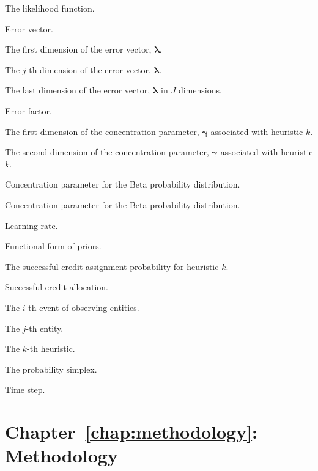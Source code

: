 \begin{description}
	\item [\parbox{2cm}{$\mathcal{L}$}] The likelihood function.
	\item [\parbox{2cm}{$\boldsymbol{\lambda}$}] Error vector.
	\item \item [\parbox{2cm}{$\lambda_{1}$}] The first dimension of the error vector, $\boldsymbol{\lambda}$.
	\item [\parbox{2cm}{$\lambda_{j}$}] The $j$-th dimension of the error vector, $\boldsymbol{\lambda}$.
	\item [\parbox{2cm}{$\lambda_{J}$}] The last dimension of the error vector, $\boldsymbol{\lambda}$ in $J$ dimensions.
	\item [\parbox{2cm}{$\epsilon$}] Error factor.
	\item [\parbox{2cm}{$\gamma_{1,k}$}] The first dimension of the concentration parameter, $\boldsymbol{\gamma}$ associated with heuristic $k$.
	\item [\parbox{2cm}{$\gamma_{2,k}$}] The second dimension of the concentration parameter, $\boldsymbol{\gamma}$ associated with heuristic $k$.
	\item [\parbox{2cm}{$\alpha$}] Concentration parameter for the Beta probability distribution.
	\item [\parbox{2cm}{$\beta$}] Concentration parameter for the Beta probability distribution.

	\item [\parbox{2cm}{$\eta$}] Learning rate.
	\item [\parbox{2cm}{$\mathcal{A}(v)$}] Functional form of priors.
	\item [\parbox{2cm}{$\psi_{k}$}] The successful credit assignment probability for heuristic $k$.
	\item [\parbox{2cm}{$c_{1}$}] Successful credit allocation.
	\item [\parbox{2cm}{$e_{i}$}] The $i$-th event of observing entities.
	\item [\parbox{2cm}{$e_{j}$}] The $j$-th entity.
	\item [\parbox{2cm}{$h_{k}$}] The $k$-th heuristic.
	\item [\parbox{2cm}{$S$}] The probability simplex.
	\item [\parbox{2cm}{$t$}] Time step.
\end{description}

\section{Chapter~\ref{chap:methodology}: Methodology}
\label{sec:symbols:methodology}

